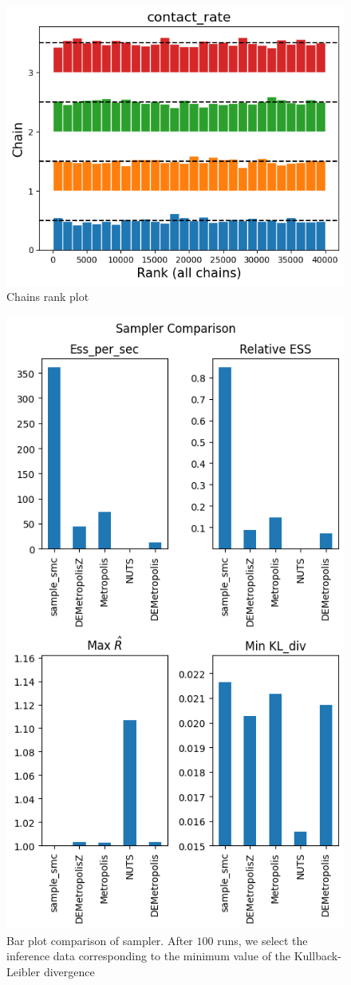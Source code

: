 \documentclass[nonatbib,preprint,12pt,authoryear]{elsarticle}
\begin{document}
\begin{figure}[h]
    \centering
    \includegraphics[width = 0.5\linewidth]{Figures/Reverse-Ingineering/rank_plot_in_pseudo_convergence_DEMz.png}
    \caption{Chains rank plot}
    \label{fig:rank_plot_pseudo_conv_DEMZ}
\end{figure}

    
\begin{figure}[H]
    \centering
    \includegraphics[width=0.7\linewidth]{Figures/Reverse-Ingineering/plot_bars_comparison_2.png}
    \caption{Bar plot comparison of sampler. After $100$ runs, we select the inference data corresponding to the minimum value of the Kullback-Leibler divergence}
    \label{fig:Reverse_Engi_Bar_plot}
\end{figure}
\end{document}
